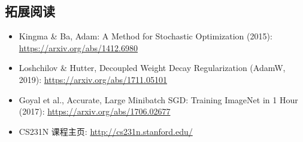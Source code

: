 \documentclass[a4paper]{article}
\begin{document}
\subsection{拓展阅读}

\begin{itemize}
    \item Kingma \& Ba, Adam: A Method for Stochastic Optimization (2015): \url{https://arxiv.org/abs/1412.6980}
    \item Loshchilov \& Hutter, Decoupled Weight Decay Regularization (AdamW, 2019): \url{https://arxiv.org/abs/1711.05101}
    \item Goyal et al., Accurate, Large Minibatch SGD: Training ImageNet in 1 Hour (2017): \url{https://arxiv.org/abs/1706.02677}
    \item CS231N 课程主页: \url{http://cs231n.stanford.edu/}
\end{itemize}
\end{document}
